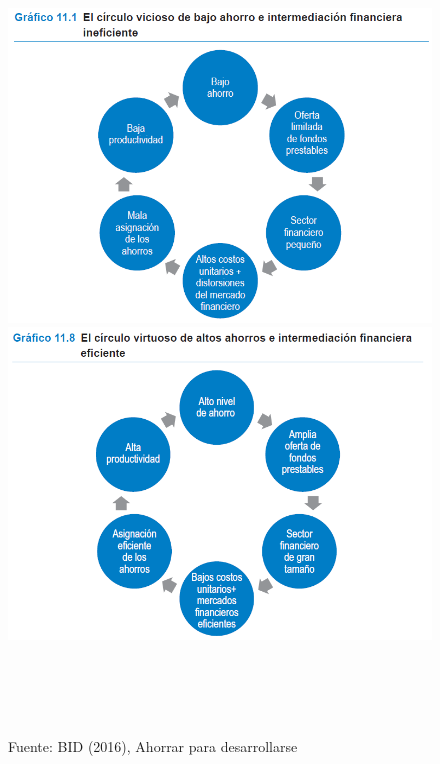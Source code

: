 \documentclass{beamer}
\begin{document}
	\begin{frame}[plain]
		\begin{figure}
			\centering
			\begin{minipage}{.5\textwidth}
				\centering
				\includegraphics[width=.9\linewidth, keepaspectratio]{vicioso}
			\end{minipage}%
			\begin{minipage}{.5\textwidth}
				\centering
				\includegraphics[width=.9\linewidth, keepaspectratio]{virtuoso}
			\end{minipage} \\~\\~\\~\\
		{\footnotesize{Fuente: BID (2016), Ahorrar para desarrollarse}}
		\end{figure}
	\end{frame}
\end{document}

